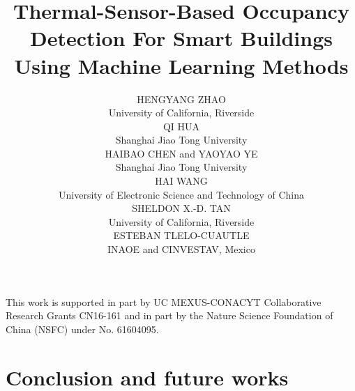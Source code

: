 \documentclass[acmtodaes,notfinal]{acmtrans2m}
\title{Thermal-Sensor-Based Occupancy Detection For Smart Buildings Using Machine Learning Methods}
\author{ \small
HENGYANG ZHAO\\
University of California, Riverside\\
QI HUA \\
Shanghai Jiao Tong University\\
HAIBAO CHEN and YAOYAO YE\\
Shanghai Jiao Tong University\\
HAI WANG \\
University of Electronic Science and Technology of China\\
SHELDON X.-D. TAN \\
University of California, Riverside\\
ESTEBAN TLELO-CUAUTLE \\
INAOE and CINVESTAV, Mexico
}
\let\orgsetcounter\setcounter
\begin{document}
{\let\setcounter\orgsetcounter
\begin{bottomstuff}
  \newline \indent This work is supported in part by UC MEXUS-CONACYT
  Collaborative Research Grants CN16-161 and in part by the Nature
  Science Foundation of China (NSFC) under No. 61604095.


\end{bottomstuff}
}

\maketitle











%
%
%
%

\section{Conclusion and future works}
\label{sec:conclution}
\end{document}
